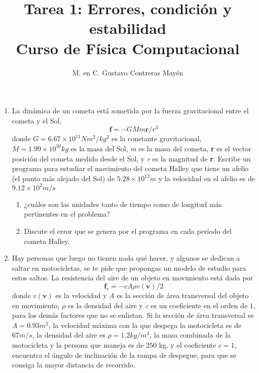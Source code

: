 \documentclass[11pt]{article}
\title{Tarea 1: Errores, condición y estabilidad \\ Curso de F\'{i}sica Computacional}
\author{M. en C. Gustavo Contreras May\'{e}n}
\date{ }
\begin{document}
\maketitle
\fontsize{14}{14}\selectfont
\begin{enumerate}
\item La din\'{a}mica de un cometa est\'{a} sometida por la fuerza gravitacional entre el cometa y el Sol, 
\[   \textbf{f} = -GMm \textbf{r}/r^{3} \]
donde $ G=6.67 \times 10^{11} Nm^{2}/kg^{2}$ es la constante gravitacional, $M=1.99 \times 10^{30} kg$ es la masa del Sol, \textit{m} es la masa del cometa, \textbf{r} es el vector posici\'{o}n del cometa medido desde el Sol, y \textit{r} es la magnitud de \textbf{r}. Escribe un programa para estudiar el movimiento del cometa Halley que tiene un afelio (el punto m\'{a}s alejado del Sol) de $5.28 \times 10^{12}m$ y la velocidad en el afelio es de $9.12 \times 10^{2} m/s$
\begin{enumerate}
\item ¿cu\'{a}les son las unidades tanto de tiempo como de longitud m\'{a}s pertinentes en el problema?
\item Discute el error que se genera por el programa en cada per\'{i}odo del cometa Halley.
\end{enumerate}
\item Hay personas que luego no tienen nada qu\'{e} hacer, y algunos se dedican a saltar en motocicletas, se te pide que propongas un modelo de estudio para estos saltos. La resistencia del aire de un objeto en movimiento est\'{a} dada por 
\[ \textbf{f}_{r} = - cA \rho v(\textbf{v})/2 \]
donde $v(\textbf{v})$ es la velocidad y \textit{A} es la secci\'{o}n de \'{a}rea transversal del objeto en movimiento, $\rho$ es la densidad del aire y \textit{c} es un coeficiente en el orden de $1$, para los dem\'{a}s factores que no se enlistan. Si la secci\'{o}n de \'{a}rea transversal es $A=0.93m^{2}$, la velocidad m\'{a}xima con la que despega la motocicleta es de $67 m/s$, la densidad del aire es
 $\rho = 1.2 kg/m^{3}$, la masa combinada de la motocicleta y la persona que maneja es de $250$ kg, y el coeficiente $c=1$, encuentra el \'{a}ngulo de inclinaci\'{o}n de la rampa de despegue, para que se consiga la mayor distancia de recorrido.

\end{enumerate}
\end{document}
